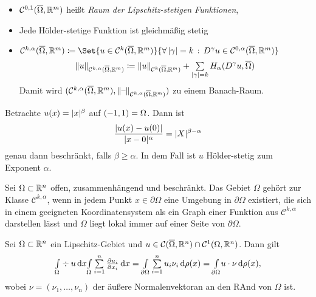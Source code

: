 \documentclass{cheat-sheet}
\newcommand{\Cont}{\mathcal{C}} %
\newcommand{\clos}[1]{\overline{#1}} %
\begin{document}
\begin{bem}
  \begin{itemize}
    \item $\Cont^{0,1}(\clos{\Omega}, \R^m)$ heißt \emph{Raum der Lipschitz-stetigen Funktionen},
    \item Jede Hölder-stetige Funktion ist gleichmäßig stetig
    \item $\Cont^{k,\alpha}(\clos{\Omega}, \R^m) \coloneqq \Set{u \in \Cont^k(\clos{\Omega}, \R^m)}{\fa{\abs{\gamma} = k} D^\gamma u \in \Cont^{0, \alpha}(\clos{\Omega}, \R^m)}$
    \[ \norm{u}_{\Cont^{k,\alpha}(\clos{\Omega}, \R^m)} \coloneqq \norm{u}_{\Cont^k(\clos{\Omega}, \R^m)} + \sum_{\abs{\gamma} = k} H_\alpha(D^\gamma u, \clos{\Omega}) \]
    Damit wird $(\Cont^{k,\alpha}(\clos{\Omega}, \R^m), \norm{\blank}_{\Cont^{k,\alpha}(\clos{\Omega}, \R^m)})$ zu einem Banach-Raum.
  \end{itemize}
\end{bem}

\begin{bsp}
  Betrachte $u(x) = \lvert x\rvert^\beta$ auf $\left( -1, 1 \right) = \Omega$. Dann ist
  \[ \frac{\lvert u(x) - u(0)\rvert}{\lvert x - 0\rvert^\alpha} = \lvert X\rvert^{\beta - \alpha} \]
  genau dann beschränkt, falls $\beta \geq \alpha$. In dem Fall ist $u$ Hölder-stetig zum Exponent $\alpha$.
\end{bsp}

\begin{defn}
  Sei $\Omega \subset \mathbb{R}^n$ offen, zusammenhängend und beschränkt.
  Das Gebiet $\Omega$ gehört zur Klasse $\Cont^{k,\alpha}$, wenn in jedem Punkt $x \in \partial \Omega$ eine Umgebung in $\partial \Omega$ existiert, die sich in einem geeigneten Koordinatensystem als ein Graph einer Funktion aus $\Cont^{k,\alpha}$ darstellen lässt und $\Omega$ liegt lokal immer auf einer Seite von $\partial \Omega$.
\end{defn}


\begin{satz}
  Sei $\Omega \subset \mathbb{R}^n$ ein Lipschitz-Gebiet und $u \in \Cont(\clos{\Omega}, \R^n) \cap \Cont^1(\Omega, \R^n)$.
  Dann gilt
  \[ \Int{\Omega}{}{\div u}{x} \Int{\Omega}{}{\sum_{i=1}^n \tfrac{\partial u_i}{\partial x_i}}{x} = \Int{\partial \Omega}{}{\sum_{i=1}^n u_i \nu_i}{\rho(x)} = \Int{\partial \Omega}{}{u \cdot \nu}{\rho(x)}, \]
  wobei $\nu = (\nu_1, \ldots, \nu_n)$ der äußere Normalenvektoran an den RAnd von $\Omega$ ist.
\end{satz}
\end{document}
